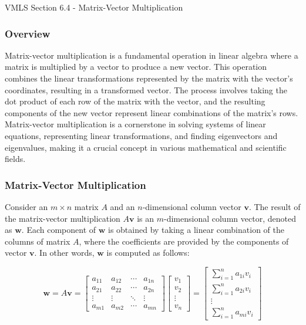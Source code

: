 \begin{notes}{VMLS Section 6.4 - Matrix-Vector Multiplication}
    \subsubsection*{Overview}

    Matrix-vector multiplication is a fundamental operation in linear algebra where a matrix is multiplied by a vector to produce a new vector. This operation combines the linear transformations represented 
    by the matrix with the vector's coordinates, resulting in a transformed vector. The process involves taking the dot product of each row of the matrix with the vector, and the resulting components of the 
    new vector represent linear combinations of the matrix's rows. Matrix-vector multiplication is a cornerstone in solving systems of linear equations, representing linear transformations, and finding 
    eigenvectors and eigenvalues, making it a crucial concept in various mathematical and scientific fields.

    \subsubsection*{Matrix-Vector Multiplication}

    Consider an $m \times n$ matrix $A$ and an $n$-dimensional column vector $\mathbf{v}$. The result of the matrix-vector multiplication $A\mathbf{v}$ is an $m$-dimensional column vector, denoted as $\mathbf{w}$. 
    Each component of $\mathbf{w}$ is obtained by taking a linear combination of the columns of matrix $A$, where the coefficients are provided by the components of vector $\mathbf{v}$. In other words, 
    $\mathbf{w}$ is computed as follows:

    \[
    \mathbf{w} = A\mathbf{v} =
    \begin{bmatrix}
    a_{11} & a_{12} & \cdots & a_{1n} \\
    a_{21} & a_{22} & \cdots & a_{2n} \\
    \vdots & \vdots & \ddots & \vdots \\
    a_{m1} & a_{m2} & \cdots & a_{mn}
    \end{bmatrix}
    \begin{bmatrix}
    v_1 \\
    v_2 \\
    \vdots \\
    v_n
    \end{bmatrix}
    =
    \begin{bmatrix}
    \sum_{i=1}^{n} a_{1i}v_i \\
    \sum_{i=1}^{n} a_{2i}v_i \\
    \vdots \\
    \sum_{i=1}^{n} a_{mi}v_i
    \end{bmatrix}
    \]


\end{notes}
